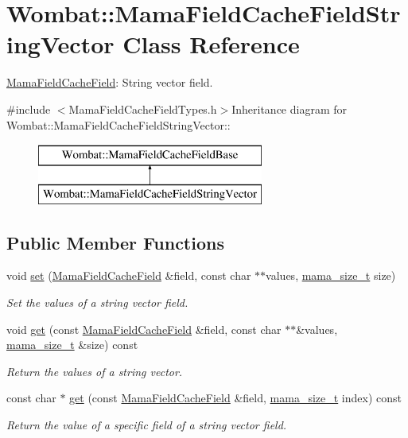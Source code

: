 \hypertarget{classWombat_1_1MamaFieldCacheFieldStringVector}{
\section{Wombat::MamaFieldCacheFieldStringVector Class Reference}
\label{classWombat_1_1MamaFieldCacheFieldStringVector}
}


\hyperlink{classWombat_1_1MamaFieldCacheField}{MamaFieldCacheField}: String vector field.  


{\ttfamily \#include $<$MamaFieldCacheFieldTypes.h$>$}Inheritance diagram for Wombat::MamaFieldCacheFieldStringVector::\begin{figure}[H]
\begin{center}
\leavevmode
\includegraphics[height=2cm]{classWombat_1_1MamaFieldCacheFieldStringVector}
\end{center}
\end{figure}
\subsection*{Public Member Functions}
\begin{DoxyCompactItemize}
\item 
void \hyperlink{classWombat_1_1MamaFieldCacheFieldStringVector_abb302eb54186f9e5d002e80595eb713f}{set} (\hyperlink{classWombat_1_1MamaFieldCacheField}{MamaFieldCacheField} \&field, const char $\ast$$\ast$values, \hyperlink{classmama__size__t}{mama\_\-size\_\-t} size)
\begin{DoxyCompactList}\small\item\em Set the values of a string vector field. \item\end{DoxyCompactList}\item 
void \hyperlink{classWombat_1_1MamaFieldCacheFieldStringVector_a030ee37c78f1e4a5201aa27802efb849}{get} (const \hyperlink{classWombat_1_1MamaFieldCacheField}{MamaFieldCacheField} \&field, const char $\ast$$\ast$\&values, \hyperlink{classmama__size__t}{mama\_\-size\_\-t} \&size) const 
\begin{DoxyCompactList}\small\item\em Return the values of a string vector. \item\end{DoxyCompactList}\item 
const char $\ast$ \hyperlink{classWombat_1_1MamaFieldCacheFieldStringVector_a7bd6adb13c4767f46c36dc312932ba3c}{get} (const \hyperlink{classWombat_1_1MamaFieldCacheField}{MamaFieldCacheField} \&field, \hyperlink{classmama__size__t}{mama\_\-size\_\-t} index) const 
\begin{DoxyCompactList}\small\item\em Return the value of a specific field of a string vector field. \item\end{DoxyCompactList}\end{DoxyCompactItemize}
